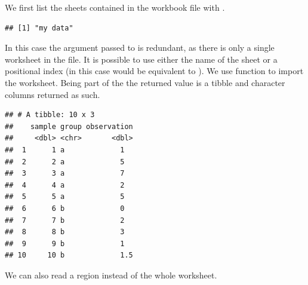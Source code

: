 \documentclass[krantz2]{krantz}\usepackage{knitr}%
\begin{document}
We first list the sheets contained in the workbook file with .

\begin{knitrout}\footnotesize
{}\color{fgcolor}\begin{kframe}
\begin{alltt}
 \hlkwb{<-} \hlstd{(}\hlstd{)}
\end{alltt}
\begin{verbatim}
## [1] "my data"
\end{verbatim}
\end{kframe}
\end{knitrout}

In this case the argument passed to  is redundant, as there is only a single worksheet in the file. It is possible to use either the name of the sheet or a positional index (in this case  would be equivalent to ). We use function  to import the worksheet. Being part of the  the returned value is a tibble and character columns returned as such.

\begin{knitrout}\footnotesize
{}\color{fgcolor}\begin{kframe}
\begin{alltt}
 \hlkwb{<-} \hlstd{(}\hlstd{,}  \hlstd{=} \hlstd{)}
\end{alltt}
\begin{verbatim}
## # A tibble: 10 x 3
##    sample group observation
##     <dbl> <chr>       <dbl>
##  1      1 a             1  
##  2      2 a             5  
##  3      3 a             7  
##  4      4 a             2  
##  5      5 a             5  
##  6      6 b             0  
##  7      7 b             2  
##  8      8 b             3  
##  9      9 b             1  
## 10     10 b             1.5
\end{verbatim}
\end{kframe}
\end{knitrout}

We can also read a region instead of the whole worksheet.
\end{document}
